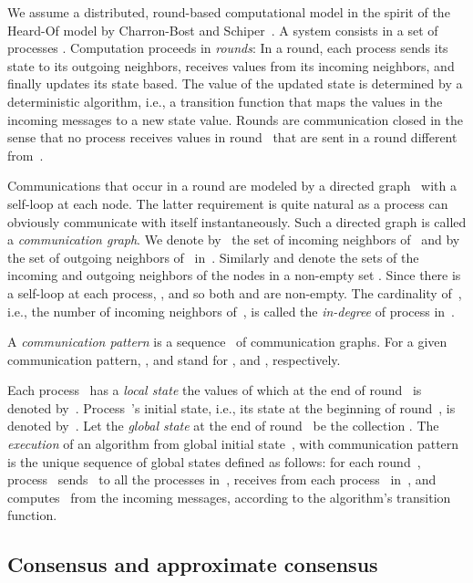 \documentclass[a4paper]{article}
\theoremstyle{newthm}
\begin{document}
We assume a distributed, round-based computational model in the spirit
     of the Heard-Of model by Charron-Bost and Schiper~\cite{CS09}.
A system consists in a set  of processes .
Computation proceeds in {\em rounds}:
In a round, each process sends its state to its outgoing neighbors,
	 receives values from its incoming neighbors, and
     finally updates its state based.
The  value of the updated state is determined by a deterministic
     algorithm, i.e., a transition function that maps the values in the
     incoming messages  to a  new state value.
Rounds are communication closed in the sense that no process receives
     values in round~ that are sent in a round different from~.

Communications that occur in a round are modeled by a directed graph~ 
	with  a self-loop at each node.
The latter requirement is quite natural as a process can obviously communicate with 
	itself instantaneously.
Such a directed graph is called a  {\em communication graph}.
We denote by~ the set
     of incoming neighbors of~ and by  the set of
     outgoing neighbors of~ in~.
Similarly  and   denote the sets of the incoming and
	outgoing neighbors of the nodes in a non-empty set .
Since there is a self-loop at each process,   
	,
	and so  both   and  
	are  non-empty.
The  cardinality of~, i.e.,  the number of incoming neighbors of~,
	is called the {\em in-degree} of process  in~.

A {\em communication pattern\/} is a sequence~ of
     communication graphs.
For a given communication pattern, ,
	 and   stand for
	,  and , respectively.

     
Each process~ has a {\em local state\/}  the values of which at
     the end of round~ is denoted by~.
Process~'s initial state, i.e., its state at the beginning of round~,
     is denoted by~.
Let the {\em global state} at the end of round~ be the collection
     .
The {\em execution\/} of an algorithm from global initial state~,
     with communication pattern~ is the unique
      sequence  of global states defined as follows:  for  each round~, 
      process~ sends~ to all the processes in~,
     receives  from each process~ in~, and
     computes~ from the incoming messages, according to the
     algorithm's transition function.
 
\subsection{Consensus and approximate consensus}
 
\end{document}
